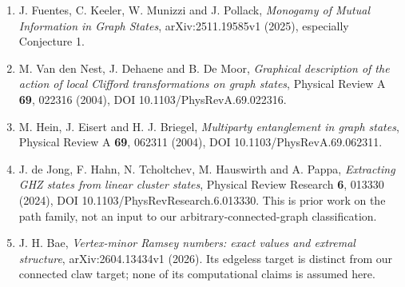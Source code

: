 \documentclass[
  11pt,
]{article}
\providecommand{\tightlist}{%
  \setlength{\itemsep}{0pt}\setlength{\parskip}{0pt}}
\begin{document}
\begin{enumerate}
\def\labelenumi{\arabic{enumi}.}
\tightlist
\item
  J. Fuentes, C. Keeler, W. Munizzi and J. Pollack, \emph{Monogamy of
  Mutual Information in Graph States}, arXiv:2511.19585v1 (2025),
  especially Conjecture 1.
\item
  M. Van den Nest, J. Dehaene and B. De Moor, \emph{Graphical
  description of the action of local Clifford transformations on graph
  states}, Physical Review A \textbf{69}, 022316 (2004), DOI
  10.1103/PhysRevA.69.022316.
\item
  M. Hein, J. Eisert and H. J. Briegel, \emph{Multiparty entanglement in
  graph states}, Physical Review A \textbf{69}, 062311 (2004), DOI
  10.1103/PhysRevA.69.062311.
\item
  J. de Jong, F. Hahn, N. Tcholtchev, M. Hauswirth and A. Pappa,
  \emph{Extracting GHZ states from linear cluster states}, Physical
  Review Research \textbf{6}, 013330 (2024), DOI
  10.1103/PhysRevResearch.6.013330. This is prior work on the path
  family, not an input to our arbitrary-connected-graph classification.
\item
  J. H. Bae, \emph{Vertex-minor Ramsey numbers: exact values and
  extremal structure}, arXiv:2604.13434v1 (2026). Its edgeless target is
  distinct from our connected claw target; none of its computational
  claims is assumed here.
\end{enumerate}
\end{document}
